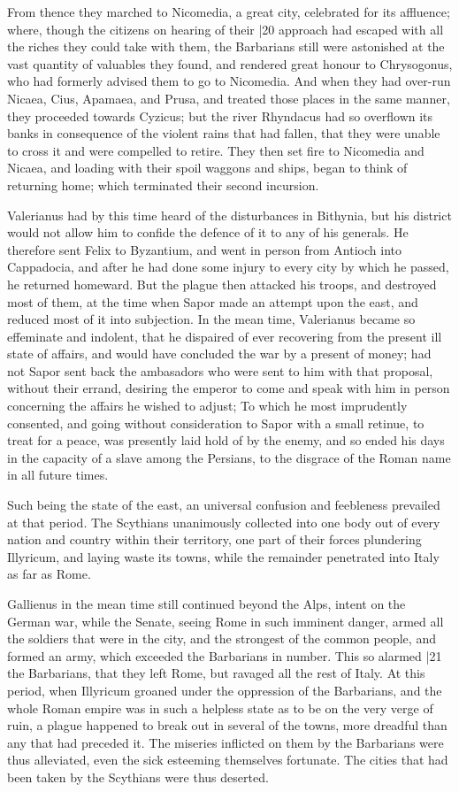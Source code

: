 From thence they marched to Nicomedia, a great city, celebrated for its affluence; where, though the citizens on hearing of their
|20 approach had escaped with all the riches they could take with them, the Barbarians still were astonished at the vast quantity of valuables they found, and rendered great honour to Chrysogonus, who had formerly advised them to go to Nicomedia. And when they had over-run Nicaea, Cius, Apamaea, and Prusa, and treated those places in the same manner, they proceeded towards Cyzicus; but the river Rhyndacus had so overflown its banks in consequence of the violent rains that had fallen, that they were unable to cross it and were compelled to retire. They then set fire to Nicomedia and Nicaea, and loading with their spoil waggons and ships, began to think of returning home; which terminated their second incursion.

Valerianus had by this time heard of the disturbances in Bithynia, but his district would not allow him to confide the defence of it to any of his generals. He therefore sent Felix to Byzantium, and went in person from Antioch into Cappadocia, and after he had done some injury to every city by which he passed, he returned homeward. But the plague then attacked his troops, and destroyed most of them, at the time when Sapor made an attempt upon the east, and reduced most of it into subjection. In the mean time, Valerianus became so effeminate and indolent, that he dispaired of ever recovering from the present ill state of affairs, and would have concluded the war by a present of money; had not Sapor sent back the ambasadors who were sent to him with that proposal, without their errand, desiring the emperor to come and speak with him in person concerning the affairs he wished to adjust; To which he most imprudently consented, and going without consideration to Sapor with a small retinue, to treat for a peace, was presently laid hold of by the enemy, and so ended his days in the capacity of a slave among the Persians, to the disgrace of the Roman name in all future times.

Such being the state of the east, an universal confusion and feebleness prevailed at that period. The Scythians unanimously collected into one body out of every nation and country within their territory, one part of their forces plundering Illyricum, and laying waste its towns, while the remainder penetrated into Italy as far as Rome.

Gallienus in the mean time still continued beyond the Alps, intent on the German war, while the Senate, seeing Rome in such imminent danger, armed all the soldiers that were in the city, and the strongest of the common people, and formed an army, which exceeded the Barbarians in number. This so alarmed
|21 the Barbarians, that they left Rome, but ravaged all the rest of Italy. At this period, when Illyricum groaned under the oppression of the Barbarians, and the whole Roman empire was in such a helpless state as to be on the very verge of ruin, a plague happened to break out in several of the towns, more dreadful than any that had preceded it. The miseries inflicted on them by the Barbarians were thus alleviated, even the sick esteeming themselves fortunate. The cities that had been taken by the Scythians were thus deserted.

